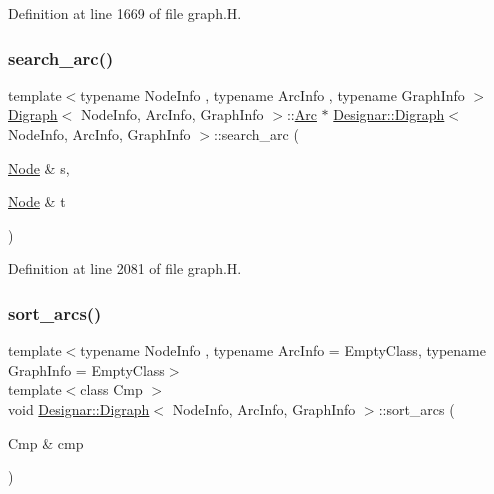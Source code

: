Definition at line 1669 of file graph.\+H.

\mbox{\label{class_designar_1_1_digraph_ac301ebe5d45b2864639d68d7e9aeea2a}} 
\subsubsection{\texorpdfstring{search\+\_\+arc()}{search\_arc()}}
{\footnotesize\ttfamily template$<$typename Node\+Info , typename Arc\+Info , typename Graph\+Info $>$ \\
\hyperlink{class_designar_1_1_digraph}{Digraph}$<$ Node\+Info, Arc\+Info, Graph\+Info $>$\+::\hyperlink{class_designar_1_1_digraph_a0ceb278671f2a535c00fddccdeafd69f}{Arc} $\ast$ \hyperlink{class_designar_1_1_digraph}{Designar\+::\+Digraph}$<$ Node\+Info, Arc\+Info, Graph\+Info $>$\+::search\+\_\+arc (\begin{DoxyParamCaption}\item[{\hyperlink{class_designar_1_1_digraph_a4dc921c41a480b7946a04170e997d8ae}{Node} \&}]{s,  }\item[{\hyperlink{class_designar_1_1_digraph_a4dc921c41a480b7946a04170e997d8ae}{Node} \&}]{t }\end{DoxyParamCaption})}



Definition at line 2081 of file graph.\+H.

\mbox{\label{class_designar_1_1_digraph_a450085493969a382371f7d4d407e42cd}} 
\subsubsection{\texorpdfstring{sort\+\_\+arcs()}{sort\_arcs()}\hspace{0.1cm}{\footnotesize\ttfamily [1/2]}}
{\footnotesize\ttfamily template$<$typename Node\+Info , typename Arc\+Info  = Empty\+Class, typename Graph\+Info  = Empty\+Class$>$ \\
template$<$class Cmp $>$ \\
void \hyperlink{class_designar_1_1_digraph}{Designar\+::\+Digraph}$<$ Node\+Info, Arc\+Info, Graph\+Info $>$\+::sort\+\_\+arcs (\begin{DoxyParamCaption}\item[{Cmp \&}]{cmp }\end{DoxyParamCaption})\hspace{0.3cm}{\ttfamily [inline]}}



